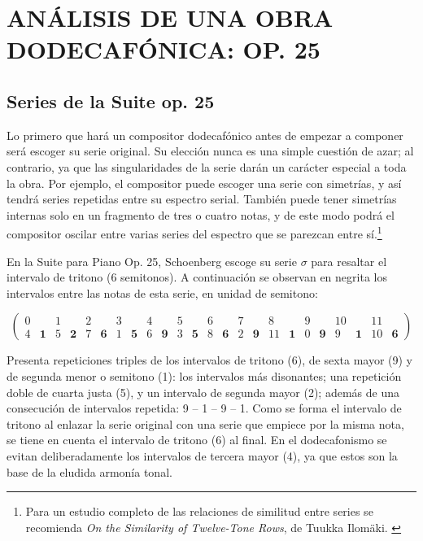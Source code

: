 \chapter{ANÁLISIS DE UNA OBRA DODECAFÓNICA: OP. 25}
\label{suitechapter}
	\section{Series de la Suite op. 25}
		Lo primero que hará un compositor dodecafónico antes de empezar a componer será escoger su serie original. Su elección nunca es una simple cuestión de azar; al contrario, ya que las singularidades de la serie darán un carácter especial a toda la obra. Por ejemplo, el compositor puede escoger una serie con simetrías, y así tendrá series repetidas entre su espectro serial. También puede tener simetrías internas solo en un fragmento de tres o cuatro notas, y de este modo podrá el compositor oscilar entre varias series del espectro que se parezcan entre sí.\footnote{Para un estudio completo de las relaciones de similitud entre series se recomienda \emph{On the Similarity of Twelve-Tone Rows}, de Tuukka Ilomäki. \cite{ilomaki}}
		
		En la Suite para Piano Op. 25, Schoenberg escoge su serie $\sigma$ para resaltar el intervalo de tritono (6 semitonos). A continuación se observan en negrita los intervalos entre las notas de esta serie, en unidad de semitono:
		
		\vspace{-0.5cm}
		\begin{footnotesize}	$$\left(\begin{matrix}0&&1&&2&&3&&4&&5&&6&&7&&8&&9&&10&&11&\\4&\mathbf{1}&5&\mathbf{2}&7&\mathbf{6}&1&\mathbf{5}&6&\mathbf{9}&3&\mathbf{5}&8&\mathbf{6}&2&\mathbf{9}&11&\mathbf{1}&0&\mathbf{9}&9&\mathbf{1}&10&\mathbf{6}\end{matrix}\right)$$		
		\end{footnotesize}\vspace{-0.5cm}
				
		Presenta repeticiones triples de los intervalos de tritono (6), de sexta mayor (9) y de segunda menor o semitono (1): los intervalos más disonantes; una repetición doble de cuarta justa (5), y un intervalo de segunda mayor (2); además de una consecución de intervalos repetida: 9 -- 1 -- 9 -- 1. Como se forma el intervalo de tritono al enlazar la serie original con una serie que empiece por la misma nota, se tiene en cuenta el intervalo de tritono (6) al final. En el dodecafonismo se evitan deliberadamente los intervalos de tercera mayor (4), ya que estos son la base de la eludida armonía tonal. \label{serie25}
		
